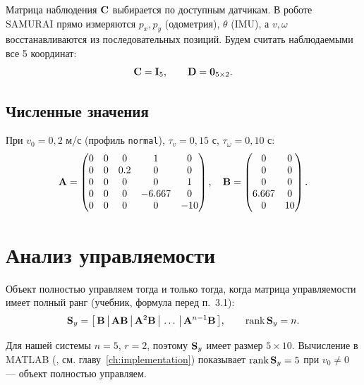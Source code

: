 Матрица наблюдения $\mathbf{C}$ выбирается по доступным датчикам.
В роботе SAMURAI прямо измеряются $p_x, p_y$ (одометрия),
$\theta$ (IMU), а $v, \omega$ восстанавливаются из последовательных
позиций. Будем считать наблюдаемыми все 5 координат:
\begin{equation}
  \mathbf{C} = \mathbf{I}_5,
  \qquad
  \mathbf{D} = \mathbf{0}_{5\times 2}.
  \label{eq:CD_matrices}
\end{equation}

\subsection{Численные значения}
\label{sec:numerics}

При $v_0 = 0{,}2$ м/с (профиль \texttt{normal}), $\tau_v = 0{,}15$ с,
$\tau_\omega = 0{,}10$ с:
\begin{equation}
  \mathbf{A} = \begin{pmatrix}
    0 & 0 & 0   & 1 & 0\\
    0 & 0 & 0.2 & 0 & 0\\
    0 & 0 & 0   & 0 & 1\\
    0 & 0 & 0   & -6.667 & 0\\
    0 & 0 & 0   & 0 & -10
  \end{pmatrix},
  \quad
  \mathbf{B} = \begin{pmatrix}
    0 & 0\\
    0 & 0\\
    0 & 0\\
    6.667 & 0\\
    0 & 10
  \end{pmatrix}.
  \label{eq:AB_numerical}
\end{equation}

\section{Анализ управляемости}
\label{sec:controllability}

Объект полностью управляем тогда и только тогда, когда матрица управляемости
имеет полный ранг (учебник, формула перед п.~3.1):
\begin{equation}
  \mathbf{S}_y = \big[\,\mathbf{B}\,\big|\,\mathbf{A}\mathbf{B}\,\big|\,\mathbf{A}^2\mathbf{B}\,\big|\,\ldots\,\big|\,\mathbf{A}^{n-1}\mathbf{B}\,\big],
  \qquad
  \operatorname{rank} \mathbf{S}_y = n.
  \label{eq:controllability}
\end{equation}

Для нашей системы $n=5$, $r=2$, поэтому $\mathbf{S}_y$ имеет размер $5 \times 10$.
Вычисление в MATLAB (, см. главу~\ref{ch:implementation})
показывает $\operatorname{rank}\mathbf{S}_y = 5$ при $v_0 \neq 0$ ---
объект полностью управляем.

